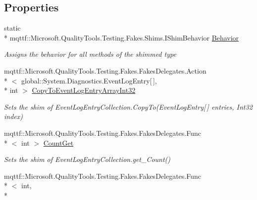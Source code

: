 \subsection*{Properties}
\begin{DoxyCompactItemize}
\item 
static \\*
mqttf\-::\-Microsoft.\-Quality\-Tools.\-Testing.\-Fakes.\-Shims.\-I\-Shim\-Behavior \hyperlink{class_system_1_1_diagnostics_1_1_fakes_1_1_shim_event_log_entry_collection_a9aae950b0870432dd4da1567442b25e9}{Behavior}
\begin{DoxyCompactList}\small\item\em Assigns the behavior for all methods of the shimmed type\end{DoxyCompactList}\item 
mqttf\-::\-Microsoft.\-Quality\-Tools.\-Testing.\-Fakes.\-Fakes\-Delegates.\-Action\\*
$<$ global\-::\-System.\-Diagnostics.\-Event\-Log\-Entry\mbox{[}$\,$\mbox{]}, \\*
int $>$ \hyperlink{class_system_1_1_diagnostics_1_1_fakes_1_1_shim_event_log_entry_collection_a4bbedccf233f89668377f058f8d981d2}{Copy\-To\-Event\-Log\-Entry\-Array\-Int32}
\begin{DoxyCompactList}\small\item\em Sets the shim of Event\-Log\-Entry\-Collection.\-Copy\-To(\-Event\-Log\-Entry\mbox{[}$\,$\mbox{]} entries, Int32 index)\end{DoxyCompactList}\item 
mqttf\-::\-Microsoft.\-Quality\-Tools.\-Testing.\-Fakes.\-Fakes\-Delegates.\-Func\\*
$<$ int $>$ \hyperlink{class_system_1_1_diagnostics_1_1_fakes_1_1_shim_event_log_entry_collection_ac0d10484072ba5e51395a0e872e10580}{Count\-Get}
\begin{DoxyCompactList}\small\item\em Sets the shim of Event\-Log\-Entry\-Collection.\-get\-\_\-\-Count()\end{DoxyCompactList}\item 
mqttf\-::\-Microsoft.\-Quality\-Tools.\-Testing.\-Fakes.\-Fakes\-Delegates.\-Func\\*
$<$ int, \\*

\end{DoxyCompactItemize}
